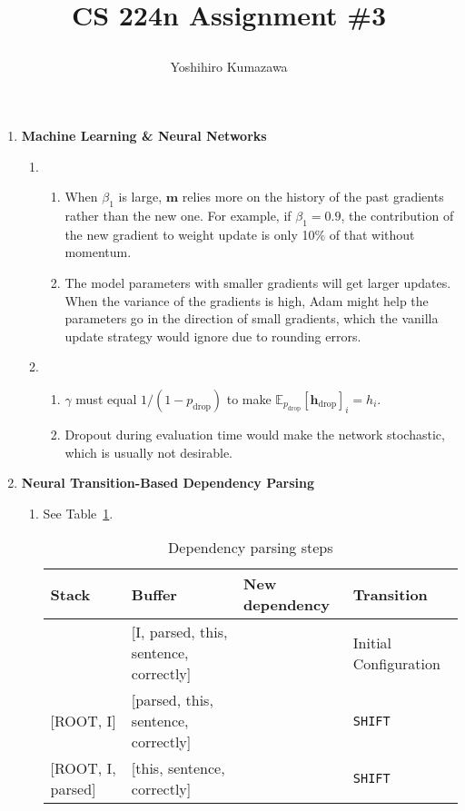 \documentclass[12pt, dvipdfmx]{article}
\title{
  \vspace{-2cm}
  CS 224n Assignment \#3 \\
  \author{Yoshihiro Kumazawa}
}
\begin{document}
\maketitle
\begin{enumerate}[label=\textbf{\arabic*.}]
\item \textbf{Machine Learning \& Neural Networks}
\begin{enumerate}[label=(\alph*)]
\item
\begin{enumerate}[label=\roman*.]
\item When $\beta_1$ is large, $\bm{m}$ relies more on the history of the past gradients rather than the new one. For example, if $\beta_1=0.9$, the contribution of the new gradient to weight update is only 10\% of that without momentum.
\item The model parameters with smaller gradients will get larger updates. When the variance of the gradients is high, Adam might help the parameters go in the direction of small gradients, which the vanilla update strategy would ignore due to rounding errors.
\end{enumerate}
\item
\begin{enumerate}[label=\roman*.]
\item $\gamma$ must equal $1/(1-p_\mathrm{drop})$ to make $\mathbb{E}_{p_\mathrm{drop}}[\bm{h}_\mathrm{drop}]_i=h_i$.
\item Dropout during evaluation time would make the network stochastic, which is usually not desirable.
\end{enumerate}
\end{enumerate}
\item \textbf{Neural Transition-Based Dependency Parsing}
\begin{enumerate}[label=(\alph*)]
\item See Table~\ref{tab:depparse}.
\begin{table}[h]
  \centering
  \caption{Dependency parsing steps} \hfill
  \label{tab:depparse}
  \begin{adjustbox}{width=\textwidth}
  \begin{tabular}{l|l|l|l}
  Stack & Buffer & New dependency & Transition \\
  \hline
  [ROOT] & [I, parsed, this, sentence, correctly] &  & Initial Configuration \\
  {[ROOT, I]} & [parsed, this, sentence, correctly] &  & \texttt{SHIFT} \\
  {[ROOT, I, parsed]} & [this, sentence, correctly] &  & \texttt{SHIFT} \\

\end{tabular}
\end{adjustbox}
\end{table}
\end{enumerate}
\end{enumerate}
\end{document}
